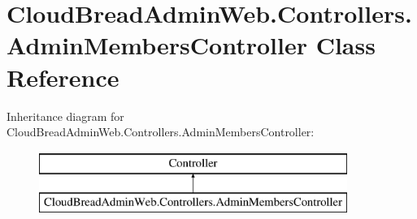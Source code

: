 \hypertarget{a00013}{}\section{Cloud\+Bread\+Admin\+Web.\+Controllers.\+Admin\+Members\+Controller Class Reference}
\label{a00013}
Inheritance diagram for Cloud\+Bread\+Admin\+Web.\+Controllers.\+Admin\+Members\+Controller\+:\begin{figure}[H]
\begin{center}
\leavevmode
\includegraphics[height=2.000000cm]{a00013}
\end{center}
\end{figure}
